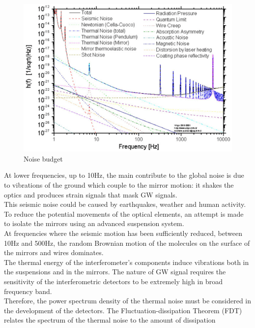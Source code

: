 \documentclass[binding=0.6cm, LaM]{sapthesis}
\begin{document}
                \begin{figure}
                        \includegraphics[scale=0.3]{noisetwo}
                        \centering
                        \caption{Noise budget}
                        \label{fig:noisetwo}
                \end{figure}

        At lower frequencies, up to 10Hz, the main contribute to the global noise
        is due to vibrations of the ground which couple to the mirror motion: it shakes the optics and produces strain signals that mask GW signals. \\
        This seismic noise could be caused by earthquakes, weather and human activity.
        To reduce the potential movements of the optical elements, an attempt is made to
        isolate the mirrors using an advanced suspension system. \\

        At frequencies where the seismic motion has been sufficiently reduced,
        between 10Hz and 500Hz, the random Brownian motion of the molecules on the surface of the mirrors and wires dominates. \\
    
        The thermal energy of the interferometer’s components induce vibrations both in the suspensions and in the mirrors.
        The nature of GW signal requires the sensitivity of the interferometric detectors
        to be extremely high in broad frequency band. \\
        Therefore, the power spectrum density of the thermal noise must be considered in the development of the detectors.
        The Fluctuation-dissipation Theorem (FDT) relates the spectrum of the thermal noise to the amount of dissipation
\end{document}
